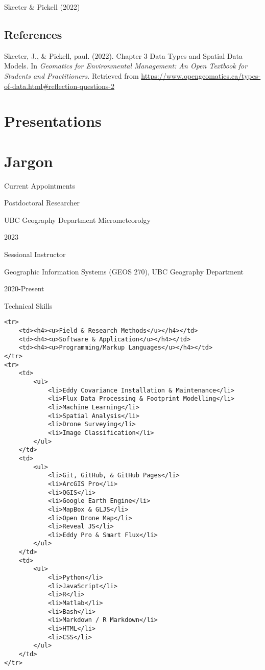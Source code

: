 \documentclass[
]{article}
\newlength{\cslhangindent}
\newlength{\cslentryspacingunit} %
\newenvironment{CSLReferences}[2] %
 {%
  \setlength{\parindent}{0pt}
  \ifodd #1
  \let\oldpar\par
  \def\par{\hangindent=\cslhangindent\oldpar}
  \fi
  \setlength{\parskip}{#2\cslentryspacingunit}
 }%
 {}
\begin{document}
Skeeter \& Pickell (2022)

\hypertarget{bibliography-4}{%
\subsection*{References}\label{bibliography-4}}

\hypertarget{refs-4}{}
\begin{CSLReferences}{1}{0}
\leavevmode{}%
Skeeter, J., \& Pickell, paul. (2022). Chapter 3 {Data} {Types} and
{Spatial} {Data} {Models}. In \emph{Geomatics for {Environmental}
{Management}: {An} {Open} {Textbook} for {Students} and
{Practitioners}}. Retrieved from
\url{https://www.opengeomatics.ca/types-of-data.html\#reflection-questions-2}

\end{CSLReferences}

\hypertarget{presentations}{%
\section{Presentations}\label{presentations}}

\hypertarget{jargon}{%
\section{Jargon}\label{jargon}}

Current Appointments

Postdoctoral Researcher

UBC Geography Department Micrometeorolgy

2023

Sessional Instructor

Geographic Information Systems (GEOS 270), UBC Geography Department

2020-Present

Technical Skills

\begin{verbatim}
<tr>
    <td><h4><u>Field & Research Methods</u></h4></td>
    <td><h4><u>Software & Application</u></h4></td>
    <td><h4><u>Programming/Markup Languages</u></h4></td>
</tr>
<tr>
    <td>
        <ul>
            <li>Eddy Covariance Installation & Maintenance</li>
            <li>Flux Data Processing & Footprint Modelling</li>
            <li>Machine Learning</li>
            <li>Spatial Analysis</li>
            <li>Drone Surveying</li>
            <li>Image Classification</li>
        </ul>
    </td>
    <td>
        <ul>
            <li>Git, GitHub, & GitHub Pages</li>
            <li>ArcGIS Pro</li>
            <li>QGIS</li>
            <li>Google Earth Engine</li>
            <li>MapBox & GLJS</li>
            <li>Open Drone Map</li>
            <li>Reveal JS</li>
            <li>Eddy Pro & Smart Flux</li>
        </ul>
    </td>
    <td>
        <ul>
            <li>Python</li>
            <li>JavaScript</li>
            <li>R</li>
            <li>Matlab</li>
            <li>Bash</li>
            <li>Markdown / R Markdown</li>
            <li>HTML</li>
            <li>CSS</li>
        </ul>
    </td>   
</tr>
\end{verbatim}
\end{document}
